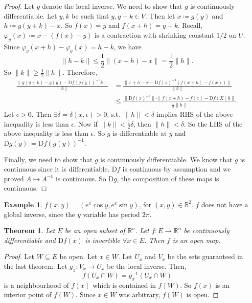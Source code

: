\documentclass[12pt]{article}
\theoremstyle{plain}
\newtheorem{thm}{Theorem}
\theoremstyle{definition}
\newtheorem*{eg}{Example}
\begin{document}
\begin{proof}
    Let $g$ denote the local inverse.
    We need to show that $g$ is continuously differentiable.
    Let $y, k$ be such that $y, y+k\in V$.
    Then let $x\coloneqq g(y)$ and $h\coloneqq g(y+k)-x$.
    So $f(x) = y$ and $f(x+h) = y+k$.
    Recall, $\varphi_y(x) \coloneqq x-(f(x)-y)$ is a contraction with shrinking constant $1/2$ on $U$.
    Since
    $\varphi_y(x+h) - \varphi_y(x) = h-k$,
    we have
    \[
        \|h-k\| \leq \frac{1}{2}\|(x+h)-x\| = \frac{1}{2}\|h\|.
    \]
    So $\|k\| \geq\frac{1}{2}\|h\|$.
    Therefore,
    \[\begin{aligned}
        \frac{\|g(y+k) - g(y) - \mathrm{D}f(g(y))^{-1}k\|}{\|k\|}
        &=\frac{\|x+h-x - \mathrm{D}f(x)^{-1}(f(x+h)-f(x))\|}{\|k\|}\\
        &\leq \frac{\|\mathrm{D}f(x)^{-1}\|\cdot\|f(x+h)-f(x)-\mathrm{D}f(X)h\|}{\frac{1}{2}\|h\|}.
    \end{aligned}\]
    Let $\epsilon>0$.
    Then $\exists \delta=\delta(x,\epsilon)>0$, s.t.\ $\|h\|<\delta$ implies RHS of the above inequality is less than $\epsilon$.
    Now if $\|k\|<\frac{1}{2}\delta$, then $\|h\|<\delta$.
    So the LHS of the above inequality is less than $\epsilon$.
    So $g$ is differentiable at $y$ and $\mathrm{D}g(y)\ = \mathrm{D}f(g(y))^{-1}$.

    Finally, we need to show that $g$ is continuously differentiable.
    We know that $g$ is continuous since it is differentiable.
    $\mathrm{D}f$ is continuous by assumption and we proved $A\mapsto A^{-1}$ is continuous.
    So $\mathrm{D}g$, the composition of these maps is continuous.
\end{proof}
\begin{eg}
    $f(x,y) = (e^x \cos y, e^x \sin y)$, for $(x,y)\in\mathbb{R}^2$.
    $f$ does not have a global inverse, since the $y$ variable has period $2\pi$.
\end{eg}

\begin{thm}
    Let $E$ be an open subset of $\mathbb{R}^n$.
    Let $f:E\rightarrow\mathbb{R}^n$ be continuously differentiable and $\mathrm{D}f(x)$ is invertible $\forall x\in E$.
    Then $f$ is an open map.
\end{thm}
\begin{proof}
    Let $W\subseteq E$ be open.
    Let $x\in W$.
    Let $U_x$ and $V_x$ be the sets guaranteed in the last theorem.
    Let $g_x:V_x\rightarrow U_x$ be the local inverse.
    Then,
    \[
        f(U_x\cap W) = g_x^{-1} (U_x\cap W)
    \]
    is a neighbourhood of $f(x)$ which is contained in $f(W)$.
    So $f(x)$ is an interior point of $f(W)$.
    Since $x\in W$ was arbitrary, $f(W)$ is open.
\end{proof}
\end{document}
